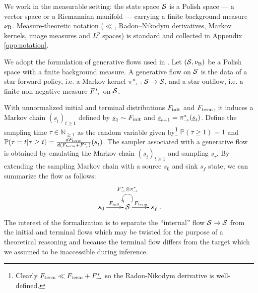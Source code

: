     
    
    We work in the measurable setting: the state space $\mathcal S$ is a Polish space --- a
    vector space or a Riemannian manifold \cite{lee2018introduction, gemici2016normalizing}
    --- carrying a finite background measure $\nu_{\mathrm{B}}$. Measure-theoretic notation
    ($\ll$, Radon--Nikodym derivatives, Markov kernels, image measures and $L^p$ spaces) is
    standard and collected in Appendix \ref{app:notation}.

    We adopt the formulation of generative flows used in \cite{brunswicEGF}.  Let $(\mathcal S,\nu_{\mathrm{B}})$ be a Polish space with a finite background measure. A generative flow on $\mathcal S$ is the data of a star forward policy, i.e. a Markov kernel $\pi_{\rightarrow}^*:\mathcal S\rightarrow \mathcal S$, and a star outflow, i.e. a finite non-negative measure $F^*_{\rightarrow}$ on $\mathcal S$.

    With unnormalized initial and terminal distributions $F_{\mathrm{init}}$ and $F_{\mathrm{term}}$,  it induces a Markov chain $(\underline s_t)_{t\geq 1}$ defined by $\underline s_{1}\sim F_{\mathrm{init}}$ and $\underline s_{t+1} = \pi_{\rightarrow}^*(\underline s_t)$.
    Define the sampling time $\tau \in \mathbb N_{\geq 1}$ as the random variable given by\footnote{Clearly $F_{\mathrm{term}} \ll F_{\mathrm{term}}+F^*_{\rightarrow}$ so the Radon-Nikodym derivative is well-defined.} $\mathbb P(\tau\geq 1)=1$ and $\mathbb P(\tau = t|\tau\geq t) = \frac{dF_{\mathrm{term}}}{d(F_{\mathrm{term}}+F^*_{\rightarrow})}(\underline s_t)$.
    The sampler associated with a generative flow is obtained by emulating the Markov chain $(\underline s_t)_{t\geq1}$ and sampling $\underline s_\tau$.
    By extending the sampling Markov chain with a source $s_0$ and sink $s_f$ state, we can summarize the flow as follows:
    \begin{equation}
        \xymatrix{
        s_0 \ar[r]^\Finit&\Statespace \ar@(ur,ul)_{\Foutstar\otimes\ForwardPolicyStar}\ar[r]^\Fterm& s_f
        }.
    \end{equation}
    The interest of the formalization is to separate the ``internal'' flow $\mathcal S\rightarrow \mathcal S$ from the initial and terminal flows which may be twisted for the purpose of a theoretical reasoning and because the terminal flow differs from the target which we assumed to be inaccessible during inference.






